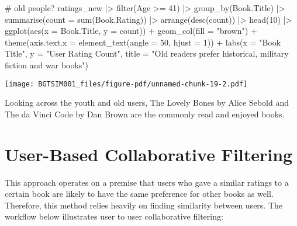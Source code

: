 \documentclass[
]{report}
\newenvironment{Shaded}{\begin{snugshade}}{\end{snugshade}}
\newcommand{\AttributeTok}[1]{\textcolor[rgb]{0.40,0.45,0.13}{#1}}
\newcommand{\CommentTok}[1]{\textcolor[rgb]{0.37,0.37,0.37}{#1}}
\newcommand{\DecValTok}[1]{\textcolor[rgb]{0.68,0.00,0.00}{#1}}
\newcommand{\FunctionTok}[1]{\textcolor[rgb]{0.28,0.35,0.67}{#1}}
\newcommand{\NormalTok}[1]{\textcolor[rgb]{0.00,0.23,0.31}{#1}}
\newcommand{\SpecialCharTok}[1]{\textcolor[rgb]{0.37,0.37,0.37}{#1}}
\newcommand{\StringTok}[1]{\textcolor[rgb]{0.13,0.47,0.30}{#1}}
\begin{document}
\begin{Shaded}
\begin{Highlighting}[]
\CommentTok{\# old people?}
\NormalTok{ratings\_new }\SpecialCharTok{|\textgreater{}}
                 \FunctionTok{filter}\NormalTok{(Age }\SpecialCharTok{\textgreater{}=} \DecValTok{41}\NormalTok{) }\SpecialCharTok{|\textgreater{}}
                 \FunctionTok{group\_by}\NormalTok{(Book.Title) }\SpecialCharTok{|\textgreater{}}
                 \FunctionTok{summarise}\NormalTok{(}\AttributeTok{count =} \FunctionTok{sum}\NormalTok{(Book.Rating)) }\SpecialCharTok{|\textgreater{}} 
                 \FunctionTok{arrange}\NormalTok{(}\FunctionTok{desc}\NormalTok{(count)) }\SpecialCharTok{|\textgreater{}}
                 \FunctionTok{head}\NormalTok{(}\DecValTok{10}\NormalTok{) }\SpecialCharTok{|\textgreater{}}
                 \FunctionTok{ggplot}\NormalTok{(}\FunctionTok{aes}\NormalTok{(}\AttributeTok{x =}\NormalTok{ Book.Title, }\AttributeTok{y =}\NormalTok{ count)) }\SpecialCharTok{+}
                  \FunctionTok{geom\_col}\NormalTok{(}\AttributeTok{fill =} \StringTok{"brown"}\NormalTok{) }\SpecialCharTok{+}
                  \FunctionTok{theme}\NormalTok{(}\AttributeTok{axis.text.x =} \FunctionTok{element\_text}\NormalTok{(}\AttributeTok{angle =} \DecValTok{50}\NormalTok{, }\AttributeTok{hjust =} \DecValTok{1}\NormalTok{)) }\SpecialCharTok{+}
                  \FunctionTok{labs}\NormalTok{(}\AttributeTok{x =} \StringTok{"Book Title"}\NormalTok{, }
                       \AttributeTok{y =} \StringTok{"User Rating Count"}\NormalTok{,}
                       \AttributeTok{title =} \StringTok{"Old readers prefer historical, military fiction and war books"}\NormalTok{)}
\end{Highlighting}
\end{Shaded}

\texttt{[image: BGTSIM001\_files/figure-pdf/unnamed-chunk-19-2.pdf]}

Looking across the youth and old users, The Lovely Bones by Alice Sebold
and The da Vinci Code by Dan Brown are the commonly read and enjoyed
books.

\section{User-Based Collaborative
Filtering}\label{user-based-collaborative-filtering}

This approach operates on a premise that users who gave a similar
ratings to a certain book are likely to have the same preference for
other books as well. Therefore, this method relies heavily on finding
similarity between users. The workflow below illustrates user to user
collaborative filtering:
\end{document}
